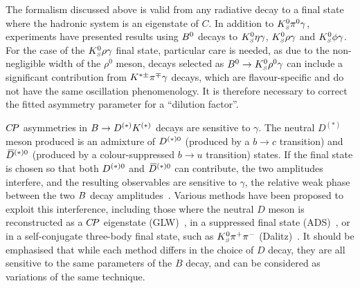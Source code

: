 The formalism discussed above is valid from any radiative decay to a final state where the hadronic system is an eigenstate of $C$.
In addition to $K^0_{\scriptscriptstyle S}\pi^0\gamma$, experiments have presented results using $B^0$ decays to $K^0_{\scriptscriptstyle S}\eta\gamma$, $K^0_{\scriptscriptstyle S}\rho\gamma$ and $K^0_{\scriptscriptstyle S}\phi\gamma$.
For the case of the $K^0_{\scriptscriptstyle S}\rho\gamma$ final state, particular care is needed, as due to the non-negligible width of the $\rho^0$ meson, decays selected as $B^0 \to K^0_{\scriptscriptstyle S}\rho^0\gamma$ can include a significant contribution from $K^{*\pm}\pi^\mp\gamma$ decays, which are flavour-specific and do not have the same oscillation phenomenology. 
It is therefore necessary to correct the fitted asymmetry parameter for a ``dilution factor''.

\label{sec:cp_uta:notations:cus}

$C\!P$ asymmetries in $B \to D^{(*)} K^{(*)}$ decays are sensitive to $\gamma$.
The neutral $D^{(*)}$ meson produced 
is an admixture of $D^{(*)0}$ (produced by a $b \to c$ transition) and 
$\kern 0.2em\overline{\kern -0.2em D}{}^{(*)0}$ (produced by a colour-suppressed $b \to u$ transition) states.
If the final state is chosen so that both $D^{(*)0}$ and $\kern 0.2em\overline{\kern -0.2em D}{}^{(*)0}$ 
can contribute, the two amplitudes interfere,
and the resulting observables are sensitive to $\gamma$, 
the relative weak phase between 
the two $B$ decay amplitudes~\cite{Bigi:1988ym}.
Various methods have been proposed to exploit this interference,
including those where the neutral $D$ meson is reconstructed 
as a $C\!P$ eigenstate (GLW)~\cite{Gronau:1990ra,Gronau:1991dp},
in a suppressed final state (ADS)~\cite{Atwood:1996ci,Atwood:2000ck},
or in a self-conjugate three-body final state, 
such as $K^0_{\scriptscriptstyle S} \pi^+\pi^-$ (Dalitz)~\cite{Giri:2003ty,Poluektov:2004mf}.
It should be emphasised that while each method 
differs in the choice of $D$ decay,
they are all sensitive to the same parameters of the $B$ decay,
and can be considered as variations of the same technique.

